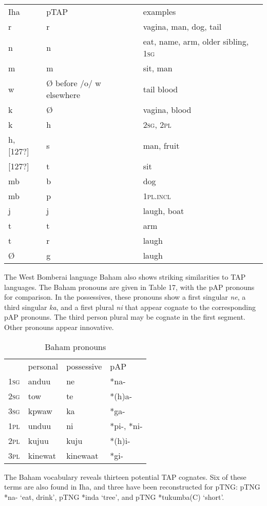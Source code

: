 \begin{table}\centering


\begin{tabular}{lll}
Iha&pTAP&examples\\
r&r&vagina, man, dog, tail\\
n&n&eat, name, arm, older sibling, \textsc{1sg}\\
m&m&sit, man\\
w&{\O} before /o/ w elsewhere&tail blood\\
k&{\O}&vagina, blood\\
k&h&\textsc{2sg, 2pl}\\
h, [127?]&s&man, fruit\footnotemark{}\\
{}[127?]&t&sit\\
mb&b&dog\\
mb&p&\textsc{1pl.incl}\\
j&j&laugh, boat\footnotemark{}\\
t&t&arm\\
t&r&laugh\\
{\O}&g&laugh\\

\end{tabular}

\caption{}\end{table}
\addtocounter{footnote}{-2}
The West Bomberai language Baham also shows striking similarities to TAP languages. The Baham pronouns are given in Table 17, with the pAP pronouns for comparison. In the possessives, these pronouns show a first singular \textit{ne}, a third singular \textit{ka}, and a first plural \textit{ni} that appear cognate to the corresponding pAP pronouns. The third person plural may be cognate in the first segment. Other pronouns appear innovative.



\begin{table}\centering


\begin{tabular}{llll}
&personal&possessive&pAP\\
\textsc{1sg}&anduu&ne&*na-\\
\textsc{2sg}&tow&te&*(h)a-\\
\textsc{3sg}&kpwaw&ka&*ga-\\
\textsc{1pl}&unduu&ni&*pi-, *ni-\\
\textsc{2pl}&kujuu&kuju&*(h)i-\\
\textsc{3pl}&kinewat&kinewaat&*gi-\\

\end{tabular}

\caption{Baham pronouns \citep{FlassyEtAl1987}}\end{table}
The Baham vocabulary reveals thirteen potential TAP cognates. Six of these terms are also found in Iha, and three have been reconstructed for pTNG: pTNG *na- `eat, drink', pTNG *inda `tree', and pTNG *tukumba(C) `short'.

